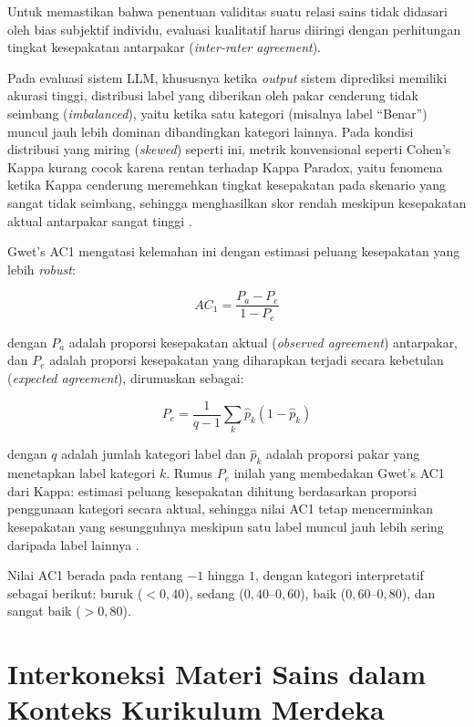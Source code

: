 \documentclass[../../thesis]{subfiles}
\begin{document}
Untuk memastikan bahwa penentuan validitas suatu relasi sains tidak
didasari oleh bias subjektif individu, evaluasi kualitatif harus
diiringi dengan perhitungan tingkat kesepakatan antarpakar
(\textit{inter-rater agreement}).

Pada evaluasi sistem LLM, khususnya ketika \textit{output} sistem
diprediksi memiliki akurasi tinggi, distribusi label yang diberikan oleh
pakar cenderung tidak seimbang (\textit{imbalanced}), yaitu ketika satu
kategori (misalnya label ``Benar'') muncul jauh lebih dominan
dibandingkan kategori lainnya. Pada kondisi distribusi yang miring
(\textit{skewed}) seperti ini, metrik konvensional seperti Cohen's Kappa
kurang cocok karena rentan terhadap Kappa Paradox, yaitu fenomena ketika Kappa
cenderung meremehkan tingkat kesepakatan pada skenario yang sangat tidak
seimbang, sehingga menghasilkan skor rendah meskipun kesepakatan aktual
antarpakar sangat tinggi \parencite{gwet_handbook_2014, james_counting_2026}.

Gwet's AC1 mengatasi kelemahan ini dengan estimasi peluang kesepakatan
yang lebih \textit{robust}:

\[
  AC_1 = \frac{P_a - P_e}{1 - P_e}
\]

\noindent dengan $P_a$ adalah proporsi kesepakatan aktual
(\textit{observed agreement}) antarpakar, dan $P_e$ adalah proporsi
kesepakatan yang diharapkan terjadi secara kebetulan (\textit{expected
agreement}), dirumuskan sebagai:

\[
  P_e = \frac{1}{q-1} \sum_{k} \hat{p}_k (1 - \hat{p}_k)
\]

\noindent dengan $q$ adalah jumlah kategori label dan $\hat{p}_k$ adalah
proporsi pakar yang menetapkan label kategori $k$. Rumus $P_e$ inilah
yang membedakan Gwet's AC1 dari Kappa: estimasi peluang kesepakatan
dihitung berdasarkan proporsi penggunaan kategori secara aktual, sehingga
nilai AC1 tetap mencerminkan kesepakatan yang sesungguhnya meskipun satu
label muncul jauh lebih sering daripada label lainnya
\parencite{gwet_handbook_2014, james_counting_2026}.

Nilai AC1 berada pada rentang $-1$ hingga $1$, dengan kategori
interpretatif sebagai berikut: buruk ($<0{,}40$), sedang
($0{,}40$--$0{,}60$), baik ($0{,}60$--$0{,}80$), dan sangat baik
($>0{,}80$).

\section{Interkoneksi Materi Sains dalam Konteks Kurikulum Merdeka}
\end{document}

